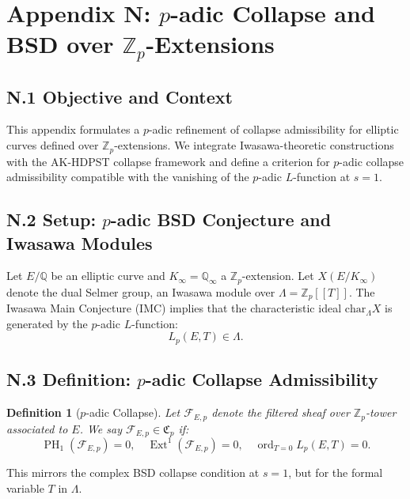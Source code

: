 \documentclass[11pt]{article}
\newtheorem{definition}[theorem]{Definition}
\DeclareMathOperator{\Ext}{Ext}
\DeclareMathOperator{\PH}{PH}
\newcommand{\ord}{\operatorname{ord}}
\begin{document}
\section*{Appendix N: \( p \)-adic Collapse and BSD over \( \mathbb{Z}_p \)-Extensions}

\subsection*{N.1 Objective and Context}

This appendix formulates a \( p \)-adic refinement of collapse admissibility for elliptic curves defined over \( \mathbb{Z}_p \)-extensions. We integrate Iwasawa-theoretic constructions with the AK-HDPST collapse framework and define a criterion for \( p \)-adic collapse admissibility compatible with the vanishing of the \( p \)-adic \( L \)-function at \( s=1 \).

\subsection*{N.2 Setup: \( p \)-adic BSD Conjecture and Iwasawa Modules}

Let \( E/\mathbb{Q} \) be an elliptic curve and \( K_\infty = \mathbb{Q}_\infty \) a \( \mathbb{Z}_p \)-extension.  
Let \( X(E/K_\infty) \) denote the dual Selmer group, an Iwasawa module over \( \Lambda = \mathbb{Z}_p[[T]] \).  
The Iwasawa Main Conjecture (IMC) implies that the characteristic ideal \( \mathrm{char}_\Lambda X \) is generated by the \( p \)-adic \( L \)-function:
\[
L_p(E, T) \in \Lambda.
\]

\subsection*{N.3 Definition: \( p \)-adic Collapse Admissibility}

\begin{definition}[\( p \)-adic Collapse]
Let \( \mathcal{F}_{E, p} \) denote the filtered sheaf over \( \mathbb{Z}_p \)-tower associated to \( E \).  
We say \( \mathcal{F}_{E,p} \in \mathfrak{C}_p \) if:
\[
\PH_1(\mathcal{F}_{E,p}) = 0, \quad \Ext^1(\mathcal{F}_{E,p}) = 0, \quad \ord_{T=0} L_p(E, T) = 0.
\]
\end{definition}

This mirrors the complex BSD collapse condition at \( s=1 \), but for the formal variable \( T \) in \( \Lambda \).
\end{document}
